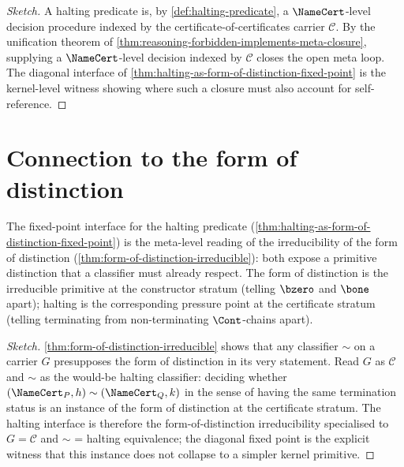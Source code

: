 \begin{proof}[Sketch]
A halting predicate is, by \autoref{def:halting-predicate}, a $\NameCert$-level decision procedure indexed by the certificate-of-certificates carrier $\mathcal{C}$. By the unification theorem of \autoref{thm:reasoning-forbidden-implements-meta-closure}, supplying a $\NameCert$-level decision indexed by $\mathcal{C}$ closes the open meta loop. The diagonal interface of \autoref{thm:halting-as-form-of-distinction-fixed-point} is the kernel-level witness showing where such a closure must also account for self-reference.
\end{proof}

\section{Connection to the form of distinction}
\label{sec:halting-form-of-distinction}

\begin{theorem}
\label{thm:halting-form-of-distinction-meta}
The fixed-point interface for the halting predicate (\autoref{thm:halting-as-form-of-distinction-fixed-point}) is the meta-level reading of the irreducibility of the form of distinction (\autoref{thm:form-of-distinction-irreducible}): both expose a primitive distinction that a classifier must already respect. The form of distinction is the irreducible primitive at the constructor stratum (telling $\bzero$ and $\bone$ apart); halting is the corresponding pressure point at the certificate stratum (telling terminating from non-terminating $\Cont$-chains apart).
\end{theorem}

\begin{proof}[Sketch]
\autoref{thm:form-of-distinction-irreducible} shows that any classifier $\sim$ on a carrier $G$ presupposes the form of distinction in its very statement. Read $G$ as $\mathcal{C}$ and $\sim$ as the would-be halting classifier: deciding whether $(\NameCert_P, h) \sim (\NameCert_Q, k)$ in the sense of having the same termination status is an instance of the form of distinction at the certificate stratum. The halting interface is therefore the form-of-distinction irreducibility specialised to $G = \mathcal{C}$ and $\sim$ = halting equivalence; the diagonal fixed point is the explicit witness that this instance does not collapse to a simpler kernel primitive.
\end{proof}

